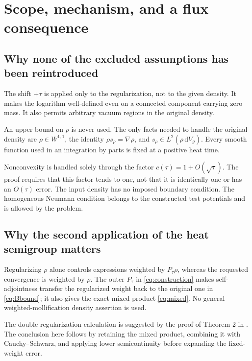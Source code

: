 \documentclass[11pt]{article}
\begin{document}
\section{Scope, mechanism, and a flux consequence}
\subsection{Why none of the excluded assumptions has been reintroduced}
The shift $+\tau$ is applied only to the regularization, not to the given density. It makes the logarithm well-defined even on a connected component carrying zero mass. It also permits arbitrary vacuum regions in the original density.

An upper bound on $\rho$ is never used. The only facts needed to handle the original density are $\rho\in W^{1,1}$, the identity $\rho s_\rho=\nabla\rho$, and $s_\rho\in L^2(\rho\,\mathrm{d}V_g)$. Every smooth function used in an integration by parts is fixed at a positive heat time.

Nonconvexity is handled solely through the factor $c(\tau)=1+O(\sqrt\tau)$. The proof requires that this factor tends to one, not that it is identically one or has an $O(\tau)$ error. The input density has no imposed boundary condition. The homogeneous Neumann condition belongs to the constructed test potentials and is allowed by the problem.

\subsection{Why the second application of the heat semigroup matters}
Regularizing $\rho$ alone controls expressions weighted by $P_\tau\rho$, whereas the requested convergence is weighted by $\rho$. The outer $P_\tau$ in \eqref{eq:construction} makes self-adjointness transfer the regularized weight back to the original one in \eqref{eq:Bbound}; it also gives the exact mixed product \eqref{eq:mixed}. No general weighted-mollification density assertion is used.

The double-regularization calculation is suggested by the proof of Theorem 2 in \cite{CFM}. The conclusion here follows by retaining the mixed product, combining it with Cauchy--Schwarz, and applying lower semicontinuity before expanding the fixed-weight error.
\end{document}
